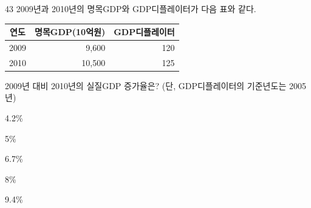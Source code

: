 \begin{question}{43}
2009년과 2010년의 명목GDP와 GDP디플레이터가 다음 표와 같다.

{\small\centering
\begin{tabular}{|c|r|r|}
\hline
연도 & \multicolumn{1}{c|}{명목GDP(10억원)} & \multicolumn{1}{c|}{GDP디플레이터} \\
\hline
2009 & 9,600 & 120 \\
\hline
2010 & 10,500 & 125 \\
\hline
\end{tabular}\par}

2009년 대비 2010년의 실질GDP 증가율은? (단, GDP디플레이터의 기준년도는 2005년) \par
\begin{choices}
  \item 4.2\%
  \item 5\%
  \item 6.7\%
  \item 8\%
  \item 9.4\%
\end{choices}
\end{question}
